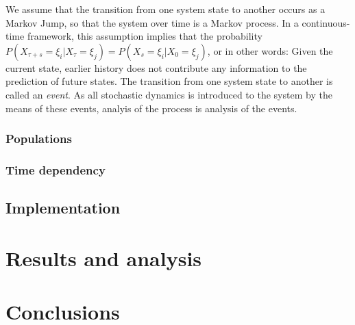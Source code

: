 \documentclass[10pt,a4paper]{article}
\begin{document}
We assume that the transition from one system state to another occurs as a Markov Jump, so that the system over time is a Markov process. In a continuous-time framework, this assumption implies that the probability $P \left( X_{\tau + s} = \xi_i | X_{\tau} = \xi_j \right) = P\left( X_{s} = \xi_i | X_{0} = \xi_j\right)$, or in other words: Given the current state, earlier history does not contribute any information to the prediction of future states. The transition from one system state to another is called an \emph{event}. As all stochastic dynamics is introduced to the system by the means of these events, analyis of the process is analysis of the events.




\subsubsection{Populations}

\subsubsection{Time dependency}

\subsection{Implementation}

\section{Results and analysis}

\section{Conclusions}


\end{document}
